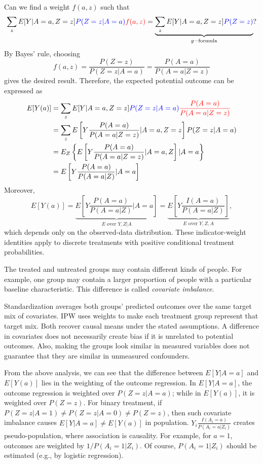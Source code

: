 \documentclass[11pt,twoside]{article}
\begin{document}
Can we find a weight $f(a,z)$ such that
\[
\sum_z E[Y|A=a,Z=z]\textcolor{blue}{P(Z=z|A=a)}\textcolor{red}{f(a,z)} = \underbrace{\sum_z E[Y|A=a,Z=z]\textcolor{blue}{P(Z=z)}}_{g-\text{formula}}?
\]
By Bayes' rule, choosing
\[
\boxed{
f(a,z) = \frac{P(Z=z)}{P(Z=z|A=a)} = \frac{P(A=a)}{P(A=a|Z=z)}}
\]
gives the desired result. Therefore, the expected potential outcome can be expressed as
\begin{align*}
   E[Y(a)] &= \sum_z E[Y|A=a,Z=z]\textcolor{blue}{P(Z=z|A=a)}\textcolor{red}{\frac{P(A=a)}{P(A=a|Z=z)}} \\
   &= \sum_z E\left[Y\frac{P(A=a)}{P(A=a|Z=z)}|A=a,Z=z\right]{P(Z=z|A=a)} \\
   &= E_Z\left\{E\left[Y\frac{P(A=a)}{P(A=a|Z=z)}|A=a,Z\right]|A=a\right\} \\
   &= E\left[Y\frac{P(A=a)}{P(A=a|Z)}|A=a\right]
\end{align*}
Moreover,
\begin{equation}
\label{eq:weight}
    \boxed{
E[Y(a)] = \underbrace{E\left[Y \frac{P(A=a)}{P(A=a|Z)}|A=a\right]}_{E \text{ over } Y,Z|A} = \underbrace{E\left[Y \frac{I(A=a)}{P(A=a|Z)}\right]}_{E \text{ over } Y,Z,A},}
\end{equation}
which depends only on the observed-data distribution. These indicator-weight identities apply to discrete treatments with positive conditional treatment probabilities.
\begin{remark}
    The treated and untreated groups may contain different kinds of people. For example, one group may contain a larger proportion of people with a particular baseline characteristic. This difference is called \emph{covariate imbalance}.

Standardization averages both groups' predicted outcomes over the same target mix of covariates. IPW uses weights to make each treatment group represent that target mix. Both recover causal means under the stated assumptions. A difference in covariates does not necessarily create bias if it is unrelated to potential outcomes. Also, making the groups look similar in measured variables does not guarantee that they are similar in unmeasured confounders.
\end{remark}

\begin{remark}
    From the above analysis, we can see that the difference between $E[Y|A=a]$ and $E[Y(a)]$ lies in the weighting of the outcome regression. In $E[Y|A=a]$, the outcome regression is weighted over $P(Z=z|A=a)$; while in $E[Y(a)]$, it is weighted over $P(Z=z)$. For binary treatment, if $P(Z=z|A=1) \neq P(Z=z|A=0) \neq P(Z=z)$, then such covariate imbalance causes $E[Y|A=a] \neq E[Y(a)]$ in population. $Y_i \frac{I(A_i=a)}{P(A_i=a|Z_i)}$ creates pseudo-population, where association is causality. For example, for $a=1$, outcomes are weighted by $1/P(A_i=1|Z_i)$. Of course, $P(A_i=1|Z_i)$ should be estimated (e.g., by logistic regression).
\end{remark}
\end{document}
